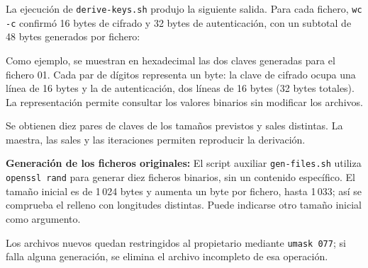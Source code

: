 \begingroup
\renewcommand{\lstlistingname}{Script}

\endgroup

La ejecución de \texttt{derive-keys.sh} produjo la siguiente salida.
Para cada fichero, \texttt{wc -c} confirmó 16 bytes de cifrado y 32 bytes de autenticación, con un subtotal de 48 bytes generados por fichero:

\begingroup
\renewcommand{\lstlistingname}{Salida y verificación}

\endgroup

Como ejemplo, se muestran en hexadecimal las dos claves generadas para el fichero 01.
Cada par de dígitos representa un byte: la clave de cifrado ocupa una línea de 16 bytes y la de autenticación, dos líneas de 16 bytes (32 bytes totales).
La representación permite consultar los valores binarios sin modificar los archivos.

\begingroup
{}

\endgroup

Se obtienen diez pares de claves de los tamaños previstos y sales distintas. La maestra, las sales y las iteraciones permiten reproducir la derivación.

\textbf{Generación de los ficheros originales:} El script auxiliar \texttt{gen-files.sh} utiliza \texttt{openssl rand} para generar diez ficheros binarios, sin un contenido específico.
El tamaño inicial es de 1\,024 bytes y aumenta un byte por fichero, hasta 1\,033; así se comprueba el relleno con longitudes distintas. Puede indicarse otro tamaño inicial como argumento.

Los archivos nuevos quedan restringidos al propietario mediante \texttt{umask 077}; si falla alguna generación, se elimina el archivo incompleto de esa operación.

\begingroup
\renewcommand{\lstlistingname}{Script}

\endgroup


